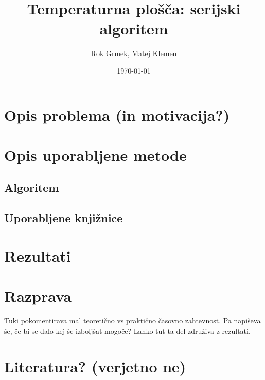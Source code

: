 \documentclass[a4paper,11pt]{article}
\title{Temperaturna plošča: serijski algoritem}
\author{Rok Grmek, Matej Klemen}
\date{\today}
\begin{document}
\maketitle

\section{Opis problema (in motivacija?)}


\section{Opis uporabljene metode}
\subsection{Algoritem}

\subsection{Uporabljene knjižnice}

\section{Rezultati}

\section{Razprava}
Tuki pokomentirava mal teoretično vs praktično časovno zahtevnost. Pa napiševa še, če bi se dalo kej še izboljšat mogoče? Lahko tut ta del združiva z rezultati.


\section{Literatura? (verjetno ne)}
\end{document}
